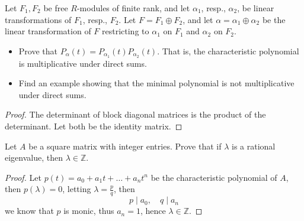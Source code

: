 \documentclass[openany]{book}
\newcommand{\Z}{\mathbb{Z}}
\begin{document}
\begin{prob}[6.10]
    Let \( F_1, F_2 \) be free \( R \)-modules of finite rank, and let \( \alpha_1 \), resp., \( \alpha_2 \), be linear transformations of \( F_1 \), resp., \( F_2 \). Let \( F = F_1 \oplus F_2 \), and let \( \alpha = \alpha_1 \oplus \alpha_2 \) be the linear transformation of \( F \) restricting to \( \alpha_1 \) on \( F_1 \) and \( \alpha_2 \) on \( F_2 \).

    \begin{itemize}
        \item Prove that \( P_\alpha(t) = P_{\alpha_1}(t)P_{\alpha_2}(t) \). That is, the characteristic polynomial is multiplicative under direct sums.
    
        \item Find an example showing that the minimal polynomial is not multiplicative under direct sums.
    \end{itemize}
\end{prob}
\begin{proof}
    The determinant of block diagonal matrices is the product of the determinant. Let both be the identity matrix.
\end{proof}


\begin{prob}[6.13]
    Let $A$ be a square matrix with integer entries. Prove that if $\lambda$ is a rational eigenvalue, then $\lambda\in\mathbb{Z}$.
\end{prob}

\begin{proof}
    Let $p(t)=a_0+a_1t+\dots+a_nt^n$ be the characteristic polynomial of $A$, then $p(\lambda)=0$, letting $\lambda=\frac{p}{q}$, then 
    \begin{equation*}
        p\mid a_0,\quad q\mid a_n
    \end{equation*}
    we know that $p$ is monic, thus $a_n=1$, hence $\lambda\in\Z$.
\end{proof}
\end{document}

